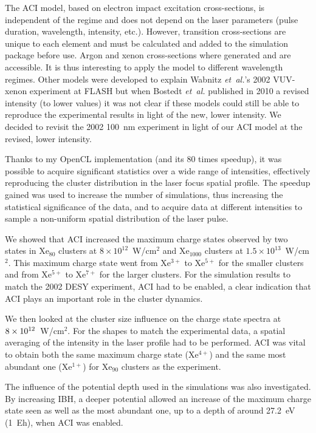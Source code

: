 The ACI model, based on electron impact excitation cross-sections, is independent of the
regime and does not depend on the laser parameters (pulse duration, wavelength,
intensity, etc.). However, transition cross-sections are unique to each element
and must be calculated and added to the simulation package before use. Argon
and xenon cross-sections where generated and are accessible. It is thus
interesting to apply the model to different wavelength regimes. Other models were developed
to explain Wabnitz \textit{et~al.}'s 2002 VUV-xenon experiment at FLASH but when
Bostedt \textit{et~al.} published in 2010 a revised intensity (to lower values) it was
not clear if these models could still be able to reproduce the experimental results
in light of the new, lower intensity. We decided to revisit the 2002 100~nm
experiment in light of our ACI model at the revised, lower intensity.

Thanks to my OpenCL implementation (and its 80 times speedup), it was possible
to acquire significant statistics over a wide range of intensities, effectively
reproducing the cluster distribution in the laser focus spatial profile. The
speedup gained was used to increase the number of simulations, thus increasing
the statistical significance of the data, and to acquire data at different
intensities to sample a non-uniform spatial distribution of the laser pulse.

We showed that ACI increased the maximum charge states observed by two states in
Xe$_{80}$ clusters at $8\times10^{12}$~W/cm$^2$ and Xe$_{1000}$ clusters
at $1.5\times10^{13}$~W/cm$^2$. This maximum charge state went from Xe$^{3+}$ to
Xe$^{5+}$ for the smaller clusters and from Xe$^{5+}$ to Xe$^{7+}$ for the
larger clusters. For the simulation results to match the 2002 DESY experiment,
ACI had to be enabled, a clear indication that ACI plays an important role in
the cluster dynamics.

We then looked at the cluster size influence on the charge state spectra
at \\ $\ten{8}{12}$~W/cm$^2$. For the shapes to match the
experimental data, a spatial averaging of the intensity in the laser profile
had to be performed. ACI was vital to obtain both the same maximum charge state
(Xe$^{4+}$) and the same most abundant one (Xe$^{1+}$) for Xe$_{90}$ clusters
as the experiment.

The influence of the potential depth used in the simulations was also
investigated. By increasing IBH, a deeper potential allowed an increase of the
maximum charge state seen as well as the most abundant one, up to a depth
of around 27.2~eV (1~Eh), when ACI was enabled.


